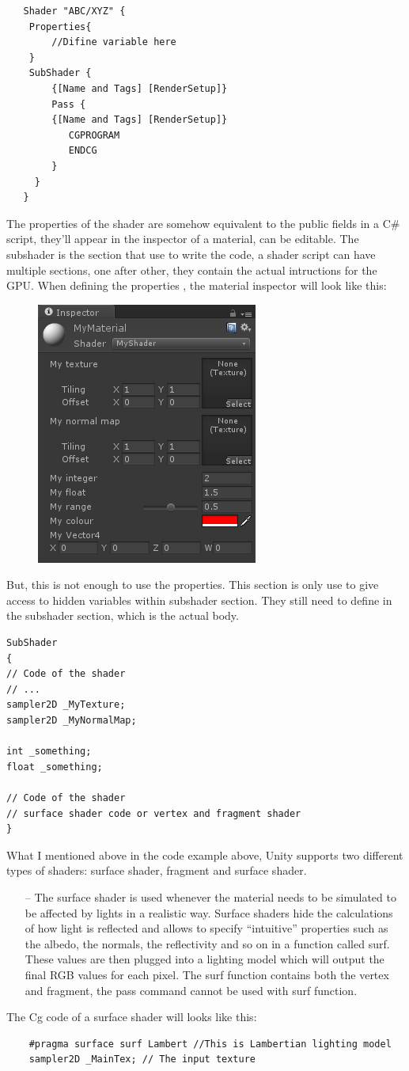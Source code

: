 \documentclass[a4paper, 13pt]{extarticle}
\begin{document}
{   \begin{lstlisting}
   Shader "ABC/XYZ" {
   	Properties{
   		//Difine variable here	
   	}
   	SubShader {
   		{[Name and Tags] [RenderSetup]}
   		Pass {
   		{[Name and Tags] [RenderSetup]}
		   CGPROGRAM
		   ENDCG
   		}
  	 }
   }
   \end{lstlisting}
  The properties of the shader are somehow equivalent to the public fields in a C\# script, they'll appear in the inspector of a material, can be editable. The subshader is the section that use to write the code, a shader script can have multiple sections, one after other, they contain the actual intructions for the GPU. When defining the properties , the material inspector will look like this: 
   \begin{figure}[h]
  	\begin{minipage}{1\textwidth}
  		\centering
  		\includegraphics[width=0.2\linewidth]{intructions/Inspector_material.png}
  		\centering
  	\end{minipage}
  \end{figure}
But, this is not enough to use the properties. This section is only use to give access to hidden variables within subshader section. They still need to define in the subshader section, which is the actual body. 
\begin{lstlisting}
SubShader
{
// Code of the shader
// ...
sampler2D _MyTexture;
sampler2D _MyNormalMap;

int _something;
float _something;

// Code of the shader
// surface shader code or vertex and fragment shader
}
\end{lstlisting}
What I mentioned above in the code example above, Unity supports two different types of shaders: surface shader, fragment and surface shader.
\begin{itemize}
	\item[--] The surface shader is used whenever the material needs to be simulated to be affected by lights in a realistic way. Surface shaders hide the calculations of how light is reflected and allows to specify “intuitive” properties such as the albedo, the normals, the reflectivity and so on in a function called surf. These values are then plugged into a lighting model which will output the final RGB values for each pixel. The surf function contains both the vertex and fragment, the pass command cannot be used with surf function.
\end{itemize}
 	The Cg code of a surface shader will looks like this: 
 	\begin{lstlisting}
 	#pragma surface surf Lambert //This is Lambertian lighting model
 	sampler2D _MainTex; // The input texture
 	

\end{lstlisting}}
\end{document}
